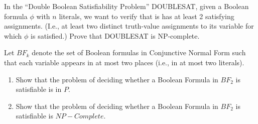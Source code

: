 \documentclass{common/cs157}
\begin{document}
\homeworkhandin %

\begin{problem}{1}
    In the ``Double Boolean Satisfiability Problem'' DOUBLESAT, given a Boolean formula $\phi$ with $n$ literals, we want to verify that is has at least 2 satisfying assignments. (I.e., at least two distinct truth-value assignments to its variable for which $\phi$ is satisfied.) Prove that DOUBLESAT is NP-complete.
\end{problem}

\newpage

\begin{problem}{2}
    Let $BF_k$ denote the set of Boolean formulas in Conjunctive Normal Form such that each variable appears in at most two places (i.e., in at most two literals).
    \begin{enumerate}
        \item Show that the problem of deciding whether a Boolean Formula in $BF_2$ is satisfiable is in $P$.
        \item Show that the problem of deciding whether a Boolean Formula in $BF_2$ is satisfiable is $NP-Complete$.
    \end{enumerate}
\end{problem}
\newpage
\end{document}
